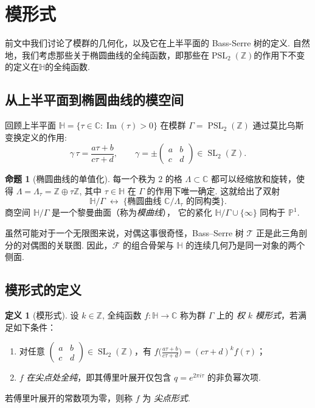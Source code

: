 \documentclass[10pt,UTF8]{ctexart}
\newcommand{\C}{\mathbb{C}}
\newcommand{\Z}{\mathbb{Z}}
\newcommand{\HH}{\mathbb{H}} %
\newcommand{\SL}{\operatorname{SL}_2(\Z)}
\newcommand{\PSL}{\operatorname{PSL}_2(\Z)}
\renewcommand{\Im}{\operatorname{Im}}
\theoremstyle{definition}
\newtheorem{proposition}[theorem]{命题}
\newtheorem{definition}[theorem]{定义}
\theoremstyle{remark}
\begin{document}
\section{模形式}\label{sec:modular Forms}

前文中我们讨论了模群的几何化，以及它在上半平面的 Bass-Serre 树的定义. 自然地，我们考虑那些关于椭圆曲线的全纯函数，即那些在$\PSL$的作用下不变的定义在$\HH$的全纯函数. 

\subsection{从上半平面到椭圆曲线的模空间}
\label{sec:elliptic_moduli}

回顾上半平面 $\HH = \{\tau\in\C : \Im(\tau)>0\}$ 在模群 $\Gamma = \PSL$ 通过莫比乌斯变换定义的作用:
$$
\gamma\,\tau = \frac{a\tau+b}{c\tau+d}, \qquad \gamma = \pm\begin{pmatrix}a&b\\c&d\end{pmatrix}\in\SL.
$$

\begin{proposition}[椭圆曲线的单值化]
每一个秩为 $2$ 的格 $\Lambda\subset\C$ 都可以经缩放和旋转，使得
$\Lambda = \Lambda_\tau = \Z\oplus\tau\Z$, 
其中 $\tau\in\HH$ 在 $\Gamma$ 的作用下唯一确定.
这就给出了双射
\[
\HH / \Gamma \;\longleftrightarrow\; \{\text{椭圆曲线 }\C/\Lambda_\tau\text{ 的同构类}\}.
\]
商空间 $\HH/\Gamma$ 是一个黎曼曲面（称为\emph{模曲线}），
它的紧化 $\HH/\Gamma\cup\{\infty\}$ 同构于 $\mathbb P^1$. 
\end{proposition}

虽然可能对于一个无限图来说，对偶这事很奇怪，Bass–Serre 树 $\mathcal{T}$ 正是此三角剖分的对偶图的关联图. 因此，$\mathcal{F}$ 的组合骨架与 $\HH$ 的连续几何乃是同一对象的两个侧面. 

\subsection{模形式的定义}

\begin{definition}[模形式]
设 $k\in\Z$, 全纯函数 $f:\HH\to\C$ 称为群 $\Gamma$ 上的 \emph{权 $k$ 模形式}，若满足如下条件：
\begin{enumerate}
    \item 对任意 $\begin{pmatrix}a&b\\c&d\end{pmatrix}\in\SL$，有 $f\!\big(\frac{a\tau+b}{c\tau+d}\big) = (c\tau+d)^k f(\tau)$；
    \item $f$ \emph{在尖点处全纯}，即其傅里叶展开仅包含 $q = e^{2\pi i\tau}$ 的非负幂次项. 
\end{enumerate}
若傅里叶展开的常数项为零，则称 $f$ 为 \emph{尖点形式}. 
\end{definition}
\end{document}
